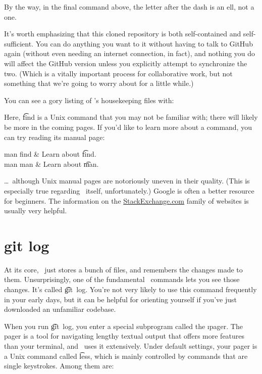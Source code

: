 \documentclass[letterpaper,12pt,titlepage,twoside]{article}
\begin{document}
By the way, in the final command above, the letter after the dash is an ell,
not a one.


It's worth emphasizing that this cloned repository is both self-contained and
self-sufficient. You can do anything you want to it without having to talk to
\textsf{GitHub} again (without even needing an internet connection, in fact),
and nothing you do will affect the \textsf{GitHub} version unless you
explicitly attempt to synchronize the two. (Which is a vitally important
process for collaborative work, but not something that we're going to worry
about for a little while.)

You can see a gory listing of \git's housekeeping files with:


Here, \t{find} is a Unix command that you may not be familiar with; there will
likely be more in the coming pages. If you'd like to learn more about a
command, you can try reading its manual page:

\begin{typeme}
man find & Learn about \t{find}. \\
man man & Learn about \t{man}.
\end{typeme}

\ldots\ although Unix manual pages are notoriously uneven in their quality.
(This is especially true regarding \git\ itself, unfortunately.) Google is
often a better resource for beginners. The information on the
\href{http://stackexchange.com/}{StackExchange.com} family of websites is
usually very helpful.


\section{git log}

At its core, \git\ just stores a bunch of files, and remembers the changes
made to them. Unsurprisingly, one of the fundamental \git\ commands lets you
see those changes. It's called \t{git~log}. You're not very likely to use this
command frequently in your early days, but it can be helpful for orienting
yourself if you've just downloaded an unfamiliar codebase.


When you run \t{git~log}, you enter a special subprogram called the \i{pager}.
The pager is a tool for navigating lengthy textual output that offers more
features than your terminal, and \git\ uses it extensively. Under default
settings, your pager is a Unix command called \t{less}, which is mainly
controlled by commands that are single keystrokes. Among them are:
\end{document}
